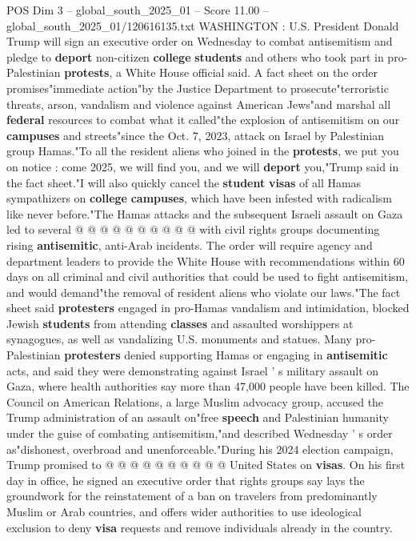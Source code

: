 \begin{textsample}{POS Dim 3 – global\_south\_2025\_01 – Score 11.00 – global\_south\_2025\_01/120616135.txt}  \label{ex:f3_pos_382}
WASHINGTON : U.S.
President Donald Trump will sign an executive order on Wednesday to combat antisemitism and pledge to \textbf{deport} non-citizen \textbf{college} \textbf{students} and others who took part in pro-Palestinian \textbf{protests}, a White House official said.
A fact sheet on the order promises"immediate action"by the Justice Department to prosecute"terroristic threats, arson, vandalism and violence against American Jews"and marshal all \textbf{federal} resources to combat what it called"the explosion of antisemitism on our \textbf{campuses} and streets"since the Oct. 7, 2023, attack on Israel by Palestinian group Hamas."To all the resident aliens who joined in the \textbf{protests}, we put you on notice : come 2025, we will find you, and we will \textbf{deport} you,"Trump said in the fact sheet."I will also quickly cancel the \textbf{student} \textbf{visas} of all Hamas sympathizers on \textbf{college} \textbf{campuses}, which have been infested with radicalism like never before."The Hamas attacks and the subsequent Israeli assault on Gaza led to several @ @ @ @ @ @ @ @ @ @ with civil rights groups documenting rising \textbf{antisemitic}, anti-Arab incidents.
The order will require agency and department leaders to provide the White House with recommendations within 60 days on all criminal and civil authorities that could be used to fight antisemitism, and would demand"the removal of resident aliens who violate our laws."The fact sheet said \textbf{protesters} engaged in pro-Hamas vandalism and intimidation, blocked Jewish \textbf{students} from attending \textbf{classes} and assaulted worshippers at synagogues, as well as vandalizing U.S. monuments and statues.
Many pro-Palestinian \textbf{protesters} denied supporting Hamas or engaging in \textbf{antisemitic} acts, and said they were demonstrating against Israel ' s military assault on Gaza, where health authorities say more than 47,000 people have been killed.
The Council on American Relations, a large Muslim advocacy group, accused the Trump administration of an assault on"free \textbf{speech} and Palestinian humanity under the guise of combating antisemitism,"and described Wednesday ' s order as"dishonest, overbroad and unenforceable."During his 2024 election campaign, Trump promised to @ @ @ @ @ @ @ @ @ @ United States on \textbf{visas}.
On his first day in office, he signed an executive order that rights groups say lays the groundwork for the reinstatement of a ban on travelers from predominantly Muslim or Arab countries, and offers wider authorities to use ideological exclusion to deny \textbf{visa} requests and remove individuals already in the country.

\end{textsample}
